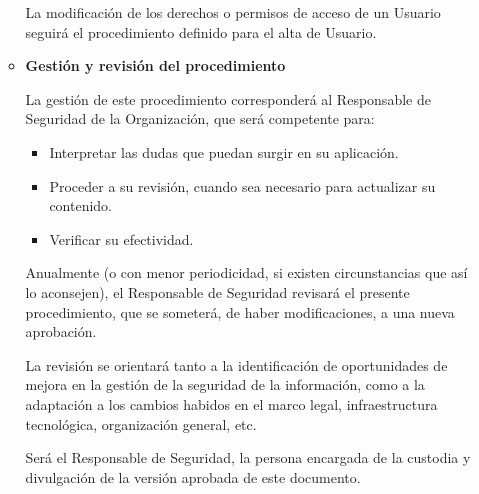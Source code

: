 \begin{enumerate}[label=\alph*)]
\begin{itemize}
        La modificación de los derechos o permisos de acceso de un Usuario seguirá el procedimiento definido para el alta de Usuario.

        \item \textbf{Gestión y revisión del procedimiento}

        La gestión de este procedimiento corresponderá al Responsable de Seguridad de la Organización, que será competente para:

        \begin{itemize}
            \item Interpretar las dudas que puedan surgir en su aplicación.
            \item Proceder a su revisión, cuando sea necesario para actualizar su contenido.
            \item Verificar su efectividad.
        \end{itemize}

        Anualmente (o con menor periodicidad, si existen circunstancias que así lo aconsejen), el Responsable de Seguridad revisará el presente procedimiento, que se someterá, de haber modificaciones, a una nueva aprobación.

        La revisión se orientará tanto a la identificación de oportunidades de mejora en la gestión de la seguridad de la información, como a la adaptación a los cambios habidos en el marco legal, infraestructura tecnológica, organización general, etc.

        Será el Responsable de Seguridad, la persona encargada de la custodia y divulgación de la versión aprobada de este documento.

    \end{itemize}

\end{enumerate}